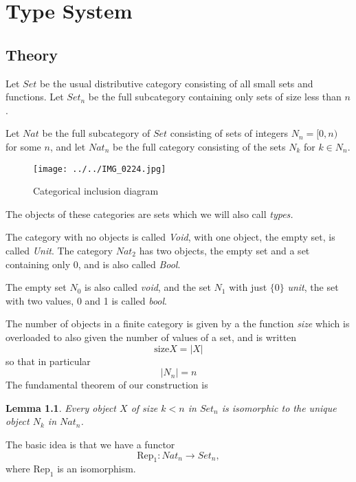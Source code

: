 \documentclass[oneside]{book}
\theoremstyle{plain}
\theoremstyle{definition}
\theoremstyle{plain}
\newtheorem{lemma}{Lemma}
\def\Set{\mathit{Set}}
\def\Nat{\mathit{Nat}}
\begin{document}
\chapter{Type System}
\section{Theory}
Let $\Set$ be the usual distributive category consisting of all small sets and functions.
Let $\Set_n$ be the full subcategory containing only sets of size less than $n$.

Let $\Nat$ be the full subcategory of $\Set$ consisting
of sets of integers $\mathit{N}_n=[0,n)$ for some $n$, and let
$\Nat_n$ be the full category consisting of the 
sets $N_k$ for $k\in \mathit{N}_n$.

\begin{figure}[h]
\texttt{[image: ../../IMG\_0224.jpg]}
\caption{Categorical inclusion diagram}
\label{fig:categorical inclusion}
\end{figure}

The objects of these categories are sets which we will also call {\em types.}

The category with no objects is called {\em Void}, with one object, the empty set,
is called {\em Unit}. The category $\mathit{Nat_2}$ has two objects, the empty set
and a set containing only 0, and is also called {\em Bool}.

The empty set $\mathit{N_0}$ is also called {\em void}, and the set $\mathit{N_1}$
with just $\{0\}$ {\em unit}, the set with two values, 0 and 1 is called {\em bool}.

The number of objects in a finite category is given by a the function {\em size}
which is overloaded to also given the number of values of a set, and is written
\begin{equation}
\mathrm{size}X = |X|
\end{equation}
so that in particular
\begin{equation}
|N_n|=n
\end{equation}
The fundamental theorem of our construction is
\begin{lemma}
Every object $X$ of size $k<n$ in $\mathit{Set_n}$ is isomorphic to the unique object $N_k$
in $\mathit{Nat_n}$. 
\end{lemma}

The basic idea is that we have a functor 
\begin{equation}
\mathrm{Rep_1}: \Nat_n\rightarrow \Set_n,
\end{equation}
where $\mathrm{Rep}_1$ is an isomorphism.
\end{document}
